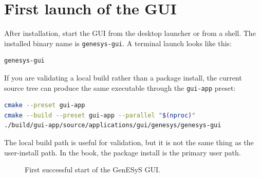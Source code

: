 \section{First launch of the GUI}
\label{sec:user-installation-first-launch}

After installation, start the GUI from the desktop launcher or from a shell.
The installed binary name is \texttt{genesys-gui}. A terminal launch looks like
this:

\begin{lstlisting}[language=bash,caption={Starting the installed GenESyS GUI},label={lst:user-installation-start-gui}]
genesys-gui
\end{lstlisting}

If you are validating a local build rather than a package install, the current
source tree can produce the same executable through the \texttt{gui-app}
preset:

\begin{lstlisting}[language=bash,caption={Local build-and-run validation path},label={lst:user-installation-build-path}]
cmake --preset gui-app
cmake --build --preset gui-app --parallel "$(nproc)"
./build/gui-app/source/applications/gui/genesys/genesys-gui
\end{lstlisting}

The local build path is useful for validation, but it is not the same thing as
the user-install path. In the book, the package install is the primary user
path.

\begin{figure}[htbp]
    \centering



    \caption{First successful start of the GenESyS GUI.}
    \label{fig:user-first-start}
\end{figure}

